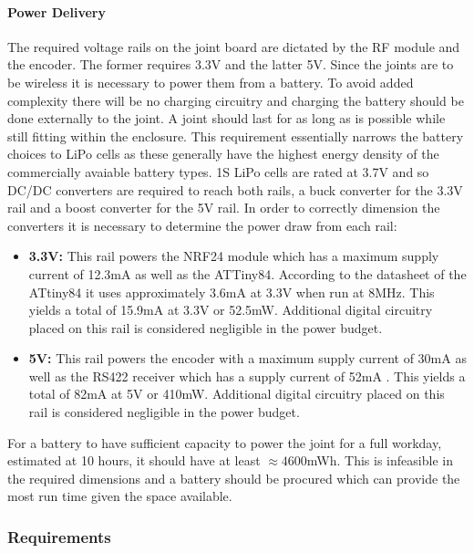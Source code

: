 \paragraph{Power Delivery} %
\label{par:power_delivery}
The required voltage rails on the joint board are dictated by the RF module and the encoder.
The former requires 3.3V and the latter 5V.
Since the joints are to be wireless it is necessary to power them from a battery.
To avoid added complexity there will be no charging circuitry and charging the battery should be done externally to the joint.
A joint should last for as long as is possible while still fitting within the enclosure.
This requirement essentially narrows the battery choices to LiPo cells as these generally have the highest energy density of the commercially avaiable battery types.
1S LiPo cells are rated at 3.7V and so DC/DC converters are required to reach both rails, a buck converter for the 3.3V rail and a boost converter for the 5V rail.
In order to correctly dimension the converters it is necessary to determine the power draw from each rail:
\begin{itemize}
 	\item \textbf{3.3V:} This rail powers the NRF24 module which has a maximum supply current of 12.3mA \cite{NFR24L01} as well as the ATTiny84.
 	According to the datasheet of the ATtiny84 it uses approximately 3.6mA at 3.3V when run at 8MHz.   
 	This yields a total of 15.9mA at 3.3V or 52.5mW.
 	Additional digital circuitry placed on this rail is considered negligible in the power budget.
 	\item \textbf{5V:} This rail powers the encoder with a maximum supply current of 30mA \cite{RLC2IC} as well as the RS422 receiver which has a supply current of 52mA \cite{rs422rec}.
 	This yields a total of 82mA at 5V or 410mW.
 	Additional digital circuitry placed on this rail is considered negligible in the power budget.
\end{itemize}
For a battery to have sufficient capacity to power the joint for a full workday, estimated at 10 hours, it should have at least $\approx4600$mWh.
This is infeasible in the required dimensions and a battery should be procured which can provide the most run time given the space available.

\subsubsection{Requirements}

